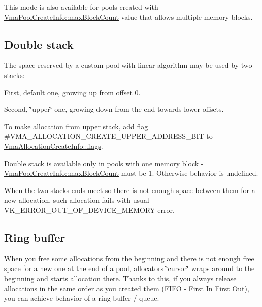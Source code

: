 This mode is also available for pools created with \hyperlink{structVmaPoolCreateInfo_ae41142f2834fcdc82baa4883c187b75c}{Vma\+Pool\+Create\+Info\+::max\+Block\+Count} value that allows multiple memory blocks.\hypertarget{custom_memory_pools_linear_algorithm_double_stack}{}\subsection{Double stack}\label{custom_memory_pools_linear_algorithm_double_stack}
The space reserved by a custom pool with linear algorithm may be used by two stacks\+:


\begin{DoxyItemize}
\item First, default one, growing up from offset 0.
\item Second, \char`\"{}upper\char`\"{} one, growing down from the end towards lower offsets.
\end{DoxyItemize}

To make allocation from upper stack, add flag \#\+V\+M\+A\+\_\+\+A\+L\+L\+O\+C\+A\+T\+I\+O\+N\+\_\+\+C\+R\+E\+A\+T\+E\+\_\+\+U\+P\+P\+E\+R\+\_\+\+A\+D\+D\+R\+E\+S\+S\+\_\+\+B\+IT to \hyperlink{structVmaAllocationCreateInfo_add09658ac14fe290ace25470ddd6d41b}{Vma\+Allocation\+Create\+Info\+::flags}.



Double stack is available only in pools with one memory block -\/ \hyperlink{structVmaPoolCreateInfo_ae41142f2834fcdc82baa4883c187b75c}{Vma\+Pool\+Create\+Info\+::max\+Block\+Count} must be 1. Otherwise behavior is undefined.

When the two stacks\textquotesingle{} ends meet so there is not enough space between them for a new allocation, such allocation fails with usual {\ttfamily V\+K\+\_\+\+E\+R\+R\+O\+R\+\_\+\+O\+U\+T\+\_\+\+O\+F\+\_\+\+D\+E\+V\+I\+C\+E\+\_\+\+M\+E\+M\+O\+RY} error.\hypertarget{custom_memory_pools_linear_algorithm_ring_buffer}{}\subsection{Ring buffer}\label{custom_memory_pools_linear_algorithm_ring_buffer}
When you free some allocations from the beginning and there is not enough free space for a new one at the end of a pool, allocator\textquotesingle{}s \char`\"{}cursor\char`\"{} wraps around to the beginning and starts allocation there. Thanks to this, if you always release allocations in the same order as you created them (F\+I\+FO -\/ First In First Out), you can achieve behavior of a ring buffer / queue.




